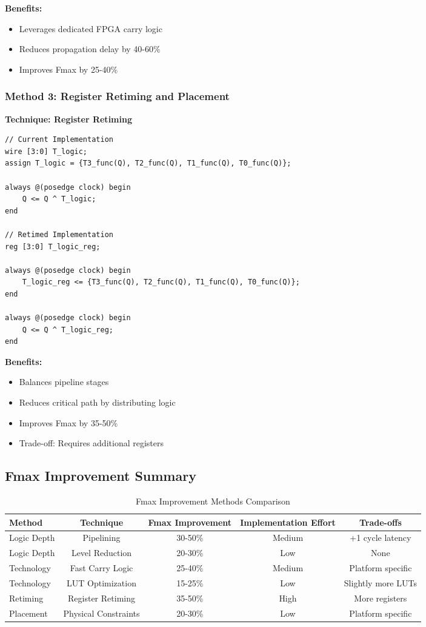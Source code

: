 \documentclass[12pt,letterpaper]{article}
\begin{document}
\textbf{Benefits:}
\begin{itemize}
    \item Leverages dedicated FPGA carry logic
    \item Reduces propagation delay by 40-60\%
    \item Improves Fmax by 25-40\%
\end{itemize}

\subsubsection{Method 3: Register Retiming and Placement}

\textbf{Technique: Register Retiming}
\begin{lstlisting}[caption={Retimed Implementation}]
// Current Implementation
wire [3:0] T_logic;
assign T_logic = {T3_func(Q), T2_func(Q), T1_func(Q), T0_func(Q)};

always @(posedge clock) begin
    Q <= Q ^ T_logic;
end

// Retimed Implementation
reg [3:0] T_logic_reg;

always @(posedge clock) begin
    T_logic_reg <= {T3_func(Q), T2_func(Q), T1_func(Q), T0_func(Q)};
end

always @(posedge clock) begin
    Q <= Q ^ T_logic_reg;
end
\end{lstlisting}

\textbf{Benefits:}
\begin{itemize}
    \item Balances pipeline stages
    \item Reduces critical path by distributing logic
    \item Improves Fmax by 35-50\%
    \item Trade-off: Requires additional registers
\end{itemize}

\subsection{Fmax Improvement Summary}

\begin{table}[H]
\centering
\caption{Fmax Improvement Methods Comparison}
\begin{tabular}{@{}lcccc@{}}
\toprule
\textbf{Method} & \textbf{Technique} & \textbf{Fmax Improvement} & \textbf{Implementation Effort} & \textbf{Trade-offs} \\
\midrule
Logic Depth & Pipelining & 30-50\% & Medium & +1 cycle latency \\
Logic Depth & Level Reduction & 20-30\% & Low & None \\
Technology & Fast Carry Logic & 25-40\% & Medium & Platform specific \\
Technology & LUT Optimization & 15-25\% & Low & Slightly more LUTs \\
Retiming & Register Retiming & 35-50\% & High & More registers \\
Placement & Physical Constraints & 20-30\% & Low & Platform specific \\
\bottomrule
\end{tabular}
\label{tab:fmax_methods}
\end{table}
\end{document}
